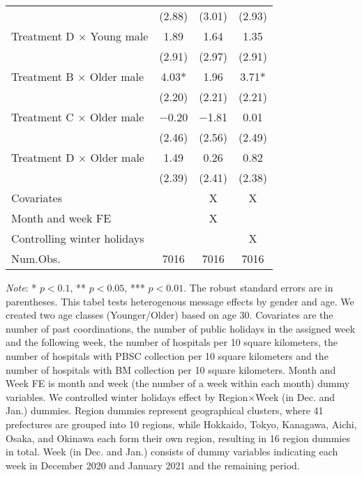 \documentclass[12pt, a4paper]{article}
\begin{document}
\begin{table}[H]
\begin{threeparttable}
\begin{tabular}[t]{lccc}
 & (\num{2.88}) & (\num{3.01}) & (\num{2.93})\\
Treatment D $\times$ Young male & \num{1.89} & \num{1.64} & \num{1.35}\\
 & (\num{2.91}) & (\num{2.97}) & (\num{2.91})\\
Treatment B $\times$ Older male & \num{4.03}* & \num{1.96} & \num{3.71}*\\
 & (\num{2.20}) & (\num{2.21}) & (\num{2.21})\\
Treatment C $\times$ Older male & \num{-0.20} & \num{-1.81} & \num{0.01}\\
 & (\num{2.46}) & (\num{2.56}) & (\num{2.49})\\
Treatment D $\times$ Older male & \num{1.49} & \num{0.26} & \num{0.82}\\
 & (\num{2.39}) & (\num{2.41}) & (\num{2.38})\\
\midrule
Covariates &  & X & X\\
Month and week FE &  & X & \\
Controlling winter holidays &  &  & X\\
Num.Obs. & \num{7016} & \num{7016} & \num{7016}\\
\bottomrule
\end{tabular}
\begin{tablenotes}
\item \emph{Note}: * $p < 0.1$, ** $p < 0.05$, *** $p < 0.01$. The robust standard errors are in parentheses. This tabel tests heterogenous message effects by gender and age. We created two age classes (Younger/Older) based on age 30. Covariates are the number of past coordinations, the number of public holidays in the assigned week and the following week, the number of hospitals per 10 square kilometers, the number of hospitals with PBSC collection per 10 square kilometers and the number of hospitals with BM collection per 10 square kilometers. Month and Week FE is month and week (the number of a week within each month) dummy variables. We controlled winter holidays effect by Region$\times$Week (in Dec. and Jan.) dummies. Region dummies represent geographical clusters, where 41 prefectures are grouped into 10 regions, while Hokkaido, Tokyo, Kanagawa, Aichi, Osaka, and Okinawa each form their own region, resulting in 16 region dummies in total. Week (in Dec. and Jan.) consists of dummy variables indicating each week in December 2020 and January 2021 and the remaining period.
\end{tablenotes}
\end{threeparttable}
\end{table}
\end{document}
